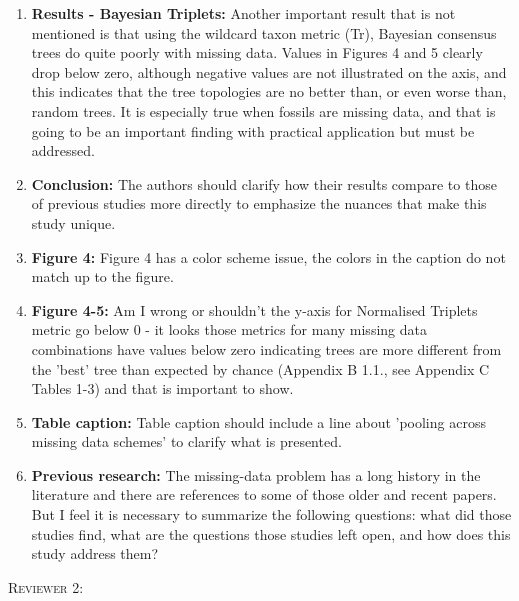 \documentclass[12pt,letterpaper]{article}
\renewcommand{\section}[1]{%
\bigskip
\begin{center}
\begin{Large}
\normalfont\scshape #1
\medskip
\end{Large}
\end{center}}
\begin{document}
\begin{enumerate}
\item{\textbf{Results - Bayesian Triplets:}} Another important result that is not mentioned is that using the wildcard taxon metric (Tr), Bayesian consensus trees do quite poorly with missing data.
Values in Figures 4 and 5 clearly drop below zero, although negative values are not illustrated on the axis, and this indicates that the tree topologies are no better than, or even worse than, random trees.
It is especially true when fossils are missing data, and that is going to be an important finding with practical application but must be addressed. 

\item{\textbf{Conclusion:}} The authors should clarify how their results compare to those of previous studies more directly to emphasize the nuances that make this study unique. 

\item{\textbf{Figure 4:}} Figure 4 has a color scheme issue, the colors in the caption do not match up to the figure.

\item{\textbf{Figure 4-5:}} Am I wrong or shouldn't the y-axis for Normalised Triplets metric go below 0 - it looks those metrics for many missing data combinations have values below zero indicating trees are more different from the 'best' tree than expected by chance (Appendix B 1.1., see Appendix C Tables 1-3) and that is important to show.

\item{\textbf{Table caption:}} Table caption should include a line about 'pooling across missing data schemes' to clarify what is presented.

\item{\textbf{Previous research:}} The missing-data problem has a long history in the literature and there are references to some of those older and recent papers.
But I feel it is necessary to summarize the following questions: what did those studies find, what are the questions those studies left open, and how does this study address them?
\end{enumerate}

\section{Reviewer 2:}
\end{document}
